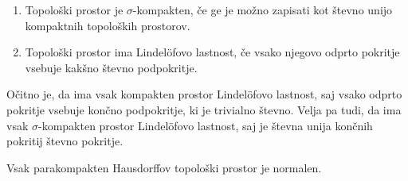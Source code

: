 \documentclass[mat1]{fmfdelo}
\begin{document}
\begin{definicija}
\begin{enumerate}
\item Topološki prostor je $\sigma$-kompakten, če ge je možno zapisati kot števno unijo kompaktnih topoloških prostorov.
\item Topološki prostor ima Lindel\"ofovo lastnost, če vsako njegovo odprto pokritje vsebuje kakšno števno podpokritje.
\end{enumerate}
\end{definicija}

\begin{opomba}
Očitno je, da ima vsak kompakten prostor Lindel\"ofovo lastnost, saj vsako odprto pokritje vsebuje končno podpokritje, ki je trivialno števno. Velja pa tudi, da ima vsak $\sigma$-kompakten prostor Lindel\"ofovo lastnost, saj je števna unija končnih pokritij števno pokritje.
\end{opomba}

\begin{trditev}\label{trd:parkompnorm} %
Vsak parakompakten Hausdorffov topološki prostor je normalen.
\end{trditev}
\end{document}
